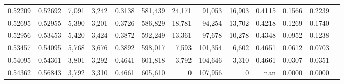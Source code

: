 \begin{tabular}{rrrrrrrrrrrrr}
0.52209 & 0.52692 &  7,091 & 3,242 &                                     0.3138 & 581,439 &  24,171 &  91,053 &  16,903 & 0.4115 & 0.1566 & 0.2239 \\
0.52695 & 0.52955 &  5,390 & 3,201 &                                     0.3726 & 586,829 &  18,781 &  94,254 &  13,702 & 0.4218 & 0.1269 & 0.1740 \\
0.52956 & 0.53453 &  5,420 & 3,424 &                                     0.3872 & 592,249 &  13,361 &  97,678 &  10,278 & 0.4348 & 0.0952 & 0.1238 \\
0.53457 & 0.54095 &  5,768 & 3,676 &                                     0.3892 & 598,017 &   7,593 & 101,354 &   6,602 & 0.4651 & 0.0612 & 0.0703 \\
0.54095 & 0.54361 &  3,801 & 3,292 &                                     0.4641 & 601,818 &   3,792 & 104,646 &   3,310 & 0.4661 & 0.0307 & 0.0351 \\
0.54362 & 0.56843 &  3,792 & 3,310 &                                     0.4661 & 605,610 &       0 & 107,956 &       0 &    nan & 0.0000 & 0.0000 \\
\bottomrule
\end{tabular}
